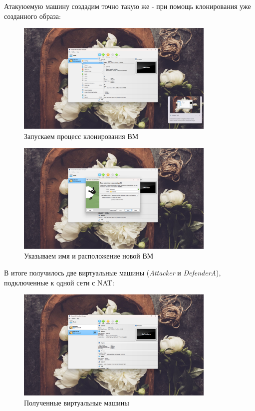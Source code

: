 \documentclass[a4paper]{article}
\begin{document}
  Атакуюемую машину создадим точно такую же - при помощь клонирования уже созданного образа:
  
  \begin{figure}[H]
    \centering
    \includegraphics[width=0.85\textwidth]{02_00 (6)}
    \caption{Запускаем процесс клонирования ВМ}
    \label{img:0006}
  \end{figure}

  \begin{figure}[H]
    \centering
    \includegraphics[width=0.85\textwidth]{02_00 (7)}
    \caption{Указываем имя и расположение новой ВМ}
    \label{img:0007}
  \end{figure}

  В итоге получилось две виртуальные машины (\textit{Attacker} и \textit{DefenderA}), подключенные к 
  одной сети с NAT:

  \begin{figure}[H]
    \centering
    \includegraphics[width=0.85\textwidth]{02_00 (8)}
    \caption{Полученные виртуальные машины}
    \label{img:0008}
  \end{figure}
\end{document}
